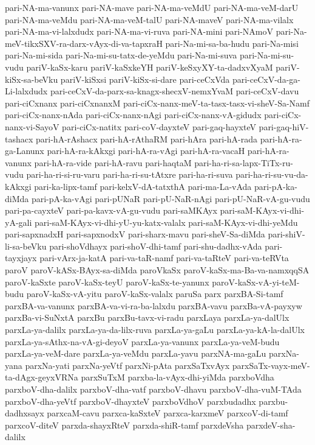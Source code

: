 {pari-NA-ma-vanunx
pari-NA-mave
pari-NA-ma-veMdU
pari-NA-ma-veM-darU
pari-NA-ma-veMdu
pari-NA-ma-veM-talU
pari-NA-maveV
pari-NA-ma-vilalx
pari-NA-ma-vi-lalxdudx
pari-NA-ma-vi-ruva
pari-NA-mini
pari-NAmoV
pari-Na-meV-tikxSXV-ra-darx-vAyx-di-va-tapxraH
pari-Na-mi-sa-ba-hudu
pari-Na-misi
pari-Na-mi-sida
pari-Na-mi-su-tatx-de-yeMdu
pari-Na-mi-suva
pari-Na-mi-su-vudu
pariV-kaSx-karu
pariV-kaSxkeYH
pariV-keSxyXY-ta-dadxvXyaM
pariV-kiSx-sa-beVku
pariV-kiSxsi
pariV-kiSx-si-dare
pari-ceCxVda
pari-ceCxV-da-ga-Li-lalxdudx
pari-ceCxV-da-parx-sa-knagx-shecxV-nemxYvaM
pari-ceCxV-davu
pari-ciCxnanx
pari-ciCxnanxM
pari-ciCx-nanx-meV-ta-tasx-tasx-vi-sheV-Sa-Namf
pari-ciCx-nanx-nAda
pari-ciCx-nanx-nAgi
pari-ciCx-nanx-vA-gidudx
pari-ciCx-nanx-vi-SayoV
pari-ciCx-natitx
pari-coV-dayxteV
pari-gaq-hayxteV
pari-gaq-hiV-tashacx
pari-hA-rAshacx
pari-hA-rAthaRM
pari-hAra
pari-hA-rada
pari-hA-ra-ga-Lanunx
pari-hA-ra-kAkxgi
pari-hA-ra-vAgi
pari-hA-ra-vacaH
pari-hA-ra-vanunx
pari-hA-ra-vide
pari-hA-ravu
pari-haqtaM
pari-ha-ri-sa-lapx-TiTx-ru-vudu
pari-ha-ri-si-ru-varu
pari-ha-ri-su-tAtxre
pari-ha-ri-suva
pari-ha-ri-su-vu-da-kAkxgi
pari-ka-lipx-tamf
pari-kelxV-dA-tatxthA
pari-ma-La-vAda
pari-pA-ka-diMda
pari-pA-ka-vAgi
pari-pUNaR
pari-pU-NaR-nAgi
pari-pU-NaR-vA-gu-vudu
pari-pa-cayxteV
pari-pa-kavx-vA-gu-vudu
pari-saMKAyx
pari-saM-KAyx-vi-dhi-yA-gali
pari-saM-KAyx-vi-dhi-yU-yu-katx-valalx
pari-saM-KAyx-vi-dhi-yeMdu
pari-sapxnadxH
pari-sapxnodxV
pari-sharx-mavu
pari-sheV-Sa-diMda
pari-shiV-li-sa-beVku
pari-shoVdhayx
pari-shoV-dhi-tamf
pari-shu-dadhx-vAda
pari-tayxjayx
pari-vArx-ja-katA
pari-va-taR-namf
pari-va-taRteV
pari-va-teRVta
paroV
paroV-kASx-BAyx-sa-diMda
paroVkaSx
paroV-kaSx-ma-Ba-va-namxqqSA
paroV-kaSxte
paroV-kaSx-teyU
paroV-kaSx-te-yanunx
paroV-kaSx-vA-yi-teM-budu
paroV-kaSx-vA-yitu
paroV-kaSx-valalx
paruSa
parx
parxBA-Si-tamf
parxBA-va-vanunx
parxBA-va-vi-ra-ba-lalxdu
parxBA-vavu
parxBa-vA-payxyw
parxBa-vi-SuNxtA
parxBu
parxBu-tavx-vi-radu
parxLaya
parxLa-ya-dalUlx
parxLa-ya-dalilx
parxLa-ya-da-lilx-ruva
parxLa-ya-gaLu
parxLa-ya-kA-la-dalUlx
parxLa-ya-sAthx-na-vA-gi-deyoV
parxLa-ya-vanunx
parxLa-ya-veM-budu
parxLa-ya-veM-dare
parxLa-ya-veMdu
parxLa-yavu
parxNA-ma-gaLu
parxNa-yana
parxNa-yati
parxNa-yeVtf
parxNi-pAta
parxSaTxvAyx
parxSaTx-vayx-meV-ta-dAgx-geyxVRNa
parxSuTxM
parxba-la-vAyx-dhi-yiMda
parxboVdha
parxboV-dha-dalilx
parxboV-dha-vatf
parxboV-dhavu
parxboV-dha-vuM-TAda
parxboV-dha-yeVtf
parxboV-dhayxteV
parxboVdhoV
parxbudadhx
parxbu-dadhxsayx
parxcaM-cavu
parxca-kaSxteV
parxca-karxmeV
parxcoV-di-tamf
parxcoV-diteV
parxda-shayxRteV
parxda-shiR-tamf
parxdeVsha
parxdeV-sha-dalilx
}
